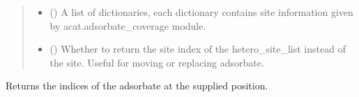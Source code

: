 \documentclass[letterpaper,10pt,english]{sphinxmanual}
\begin{document}
\begin{fulllineitems}
\begin{fulllineitems}
\begin{quote}
\begin{description}
\begin{itemize}
\item {} 
 () \textendash{} A list of dictionaries, each dictionary contains site
information given by acat.adsorbate\_coverage module.

\item {} 
 (\sphinxstyleliteralemphasis{\sphinxupquote{, }}) \textendash{} Whether to return the site index of the hetero\_site\_list instead
of the site. Useful for moving or replacing adsorbate.

\end{itemize}

\end{description}\end{quote}

\end{fulllineitems}


\begin{fulllineitems}
\label{\detokenize{ga:acat.ga.adsorbate_operators.AdsorbateOperator.get_adsorbate_indices}}
Returns the indices of the adsorbate at the supplied position.

\end{fulllineitems}


\end{fulllineitems}

\end{document}

